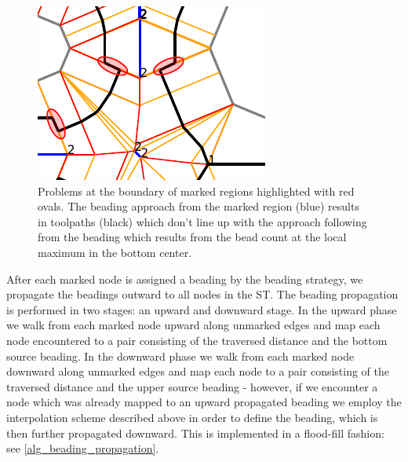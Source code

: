 \begin{figure}
\centering
\includegraphics[width=.5\columnwidth]{sources/method/transition_to_insignificance_problem.pdf}
\caption{
Problems at the boundary of marked regions highlighted with red ovals.
The beading approach from the marked region (blue) results in toolpaths (black) which don't line up with the approach following from the beading which results from the bead count at the local maximum in the bottom center.
}
\label{beading_conflict_problem}
\end{figure}

After each marked node is assigned a beading by the beading strategy, we propagate the beadings outward to all nodes in the ST.
The beading propagation is performed in two stages: an upward and downward stage.
In the upward phase we walk from each marked node upward along unmarked edges and map each node encountered to a pair consisting of the traversed distance and the bottom source beading.
In the downward phase we walk from each marked node downward along unmarked edges and map each node to a pair consisting of the traversed distance and the upper source beading -
however, if we encounter a node which was already mapped to an upward propagated beading we employ the interpolation scheme described above in order to define the beading, which is then further propagated downward.
This is implemented in a flood-fill fashion: see \cref{alg_beading_propagation}.

